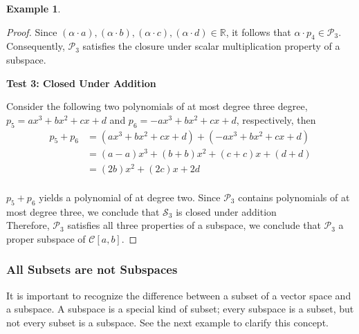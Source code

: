 \documentclass{book}
\theoremstyle{definition}
\newtheorem{example}{Example}[definition]
\theoremstyle{remark}
\newcommand{\bb}[1]{\mathbb{#1}}
\newcommand{\cc}[1]{\mathcal{#1}}
\newcommand{\m}{\cdot}
\begin{document}
\begin{example}
\begin{proof}
            Since $(\alpha \m a), (\alpha \m b), (\alpha \m c), (\alpha \m d) \in \bb{R}$, it follows that $\alpha \m p_4 \in \cc{P}_3$. Consequently, $\cc{P}_3$ satisfies the closure under scalar multiplication property of a subspace. \\
        
        
        
        \begin{flushleft} \textbf{Test 3: Closed Under Addition} \end{flushleft}
            Consider the following two polynomials of at most degree three degree, $p_5 = ax^3 + bx^2 + cx + d$ and $p_6 = -ax^3 + bx^2 + cx + d$, respectively, then
                \begin{align*}
                    p_5 + p_6 & = (ax^3 + bx^2 + cx + d) + (-ax^3 + bx^2 + cx + d) \\
                        & = (a - a)x^3 + (b+b)x^2 + (c+c)x + (d+d) \\
                        & = (2b)x^2 + (2c)x + 2d \\
                \end{align*}

            $p_5 + p_6$ yields a polynomial of at degree two. Since $\cc{P}_3$ contains polynomials of at most degree three, we conclude that $\cc{S}_3$ is closed under addition \\
        
        Therefore, $\cc{P}_3$ satisfies all three properties of a subspace, we conclude that $\cc{P}_3$ a proper subspace of $\cc{C}[a,b]$.
    \end{proof}
\end{example}




\newpage
\subsubsection{All Subsets are not Subspaces}
It is important to recognize the difference between a subset of a vector space and a subspace. A subspace is a special kind of subset; every subspace is a subset, but not every subset is a subspace. See the next example to clarify this concept.
\end{document}
